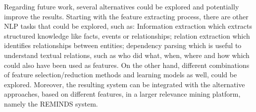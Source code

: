 Regarding future work, several alternatives could be explored and potentially improve the results. Starting with the feature extracting process, there are other NLP tasks that could be explored, such as: Information extraction which extracts structured knowledge like facts, events or relationships; relation extraction which identifies relationships between entities; dependency parsing which is useful to understand textual relations, such as who did what, when, where and how which could also have been used as features. On the other hand, different combinations of feature selection/reduction methods and learning models as well, could be explored. Moreover, the resulting system can be integrated with the alternative approaches, based on different features, in a larger relevance mining platform, namely the REMINDS system.